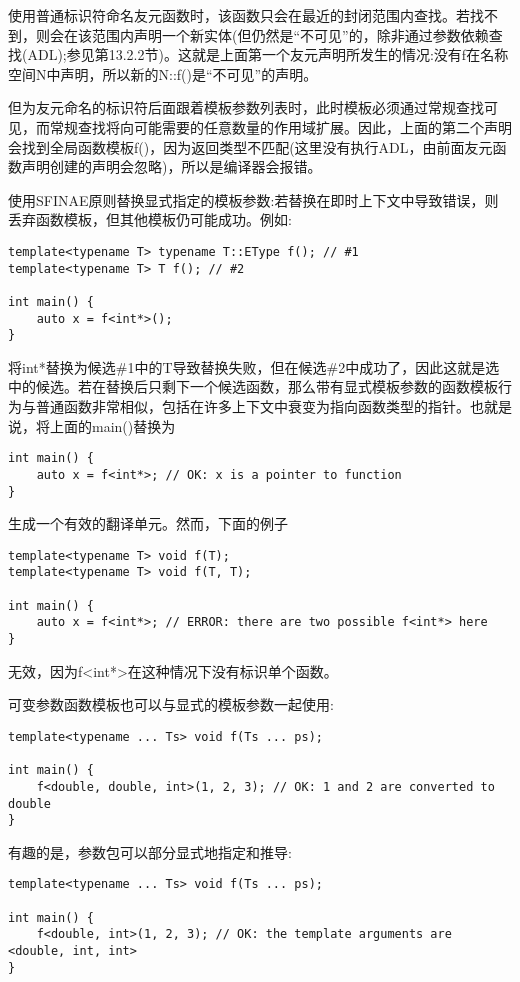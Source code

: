 使用普通标识符命名友元函数时，该函数只会在最近的封闭范围内查找。若找不到，则会在该范围内声明一个新实体(但仍然是“不可见”的，除非通过参数依赖查找(ADL);参见第13.2.2节)。这就是上面第一个友元声明所发生的情况:没有f在名称空间N中声明，所以新的N::f()是“不可见”的声明。

但为友元命名的标识符后面跟着模板参数列表时，此时模板必须通过常规查找可见，而常规查找将向可能需要的任意数量的作用域扩展。因此，上面的第二个声明会找到全局函数模板f()，因为返回类型不匹配(这里没有执行ADL，由前面友元函数声明创建的声明会忽略)，所以是编译器会报错。

使用SFINAE原则替换显式指定的模板参数:若替换在即时上下文中导致错误，则丢弃函数模板，但其他模板仍可能成功。例如:

\begin{lstlisting}[style=styleCXX]
template<typename T> typename T::EType f(); // #1
template<typename T> T f(); // #2

int main() {
	auto x = f<int*>();
}
\end{lstlisting}

将int*替换为候选\#1中的T导致替换失败，但在候选\#2中成功了，因此这就是选中的候选。若在替换后只剩下一个候选函数，那么带有显式模板参数的函数模板行为与普通函数非常相似，包括在许多上下文中衰变为指向函数类型的指针。也就是说，将上面的main()替换为

\begin{lstlisting}[style=styleCXX]
int main() {
	auto x = f<int*>; // OK: x is a pointer to function
}
\end{lstlisting}

生成一个有效的翻译单元。然而，下面的例子

\begin{lstlisting}[style=styleCXX]
template<typename T> void f(T);
template<typename T> void f(T, T);

int main() {
	auto x = f<int*>; // ERROR: there are two possible f<int*> here
}
\end{lstlisting}

无效，因为f<int*>在这种情况下没有标识单个函数。

可变参数函数模板也可以与显式的模板参数一起使用:

\begin{lstlisting}[style=styleCXX]
template<typename ... Ts> void f(Ts ... ps);

int main() {
	f<double, double, int>(1, 2, 3); // OK: 1 and 2 are converted to double
}
\end{lstlisting}

有趣的是，参数包可以部分显式地指定和推导:

\begin{lstlisting}[style=styleCXX]
template<typename ... Ts> void f(Ts ... ps);

int main() {
	f<double, int>(1, 2, 3); // OK: the template arguments are <double, int, int>
}
\end{lstlisting}









